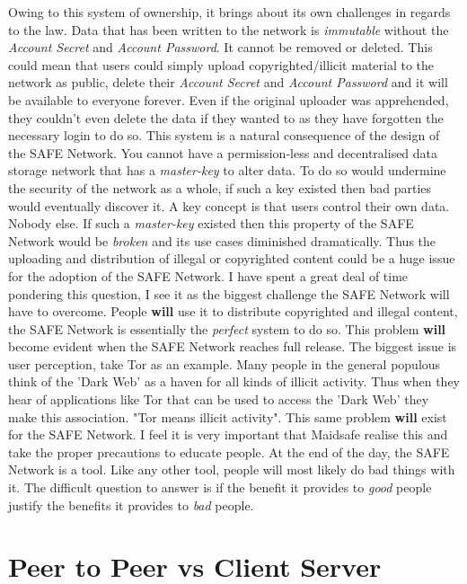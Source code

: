 Owing to this system of ownership, it brings about its own challenges in regards to the law. Data that has been written to the network is \textit{immutable} without the \textit{Account Secret} and \textit{Account Password}. It cannot be removed or deleted. This could mean that users could simply upload copyrighted/illicit material to the network as public, delete their \textit{Account Secret} and \textit{Account Password} and it will be available to everyone forever. Even if the original uploader was apprehended, they couldn't even delete the data if they wanted to as they have forgotten the necessary login to do so. This system is a natural consequence of the design of the SAFE Network. You cannot have a permission-less and decentralised data storage network that has a \textit{master-key} to alter data. To do so would undermine the security of the network as a whole, if such a key existed then bad parties would eventually discover it. A key concept is that users control their own data. Nobody else. If such a \textit{master-key} existed then this property of the SAFE Network would be \textit{broken} and its use cases diminished dramatically. Thus the uploading and distribution of illegal or copyrighted content could be a huge issue for the adoption of the SAFE Network. I have spent a great deal of time pondering this question, I see it as the biggest challenge the SAFE Network will have to overcome. People \textbf{will} use it to distribute copyrighted and illegal content, the SAFE Network is essentially the \textit{perfect} system to do so. This problem \textbf{will} become evident when the SAFE Network reaches full release. The biggest issue is user perception, take Tor\cite{tor} as an example. Many people in the general populous think of the 'Dark Web'\cite{dark-web} as a haven for all kinds of illicit activity. Thus when they hear of applications like Tor that can be used to access the 'Dark Web' they make this association. "Tor means illicit activity". This same problem \textbf{will} exist for the SAFE Network. I feel it is very important that Maidsafe realise this and take the proper precautions to educate people. At the end of the day, the SAFE Network is a tool. Like any other tool, people will most likely do bad things with it. The difficult question to answer is if the benefit it provides to \textit{good} people justify the benefits it provides to \textit{bad} people.
 
\section{Peer to Peer vs Client Server}

